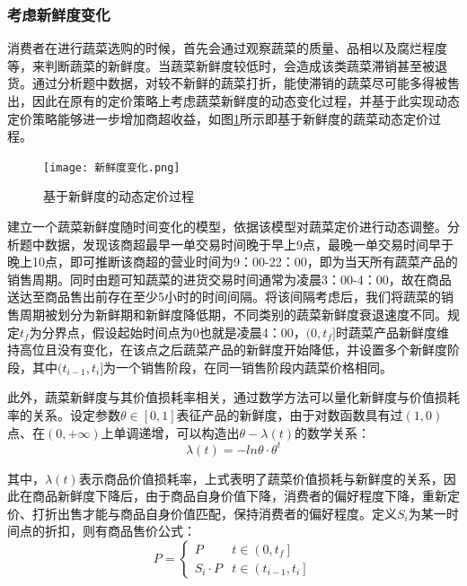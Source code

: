 \documentclass{my_paper}
\begin{document}
\subsubsection{考虑新鲜度变化}
消费者在进行蔬菜选购的时候，首先会通过观察蔬菜的质量、品相以及腐烂程度等，来判断蔬菜的新鲜度。当蔬菜新鲜度较低时，会造成该类蔬菜滞销甚至被退货。通过分析题中数据，对较不新鲜的蔬菜打折，能使滞销的蔬菜尽可能多得被售出，因此在原有的定价策略上考虑蔬菜新鲜度的动态变化过程，并基于此实现动态定价策略能够进一步增加商超收益，如图\ref{基于新鲜度的动态定价过程}所示即基于新鲜度的蔬菜动态定价过程。

\begin{figure}[H]
 \centering
 \texttt{[image: 新鲜度变化.png]} 
 \caption{基于新鲜度的动态定价过程} %
 \label{基于新鲜度的动态定价过程} %
\end{figure}\par

建立一个蔬菜新鲜度随时间变化的模型，依据该模型对蔬菜定价进行动态调整。分析题中数据，发现该商超最早一单交易时间晚于早上9点，最晚一单交易时间早于晚上10点，即可推断该商超的营业时间为9：00-22：00，即为当天所有蔬菜产品的销售周期。同时由题可知蔬菜的进货交易时间通常为凌晨3：00-4：00，故在商品送达至商品售出前存在至少5小时的时间间隔。将该间隔考虑后，我们将蔬菜的销售周期被划分为新鲜期和新鲜度降低期，不同类别的蔬菜新鲜度衰退速度不同。规定$t_f$为分界点，假设起始时间点为0也就是凌晨4：00，$(0,t_f]$时蔬菜产品新鲜度维持高位且没有变化，在该点之后蔬菜产品的新鲜度开始降低，并设置多个新鲜度阶段，其中$(t_{i-1},t_i]$为一个销售阶段，在同一销售阶段内蔬菜价格相同。

此外，蔬菜新鲜度与其价值损耗率相关，通过数学方法可以量化新鲜度与价值损耗率的关系。设定参数$\theta \in [0,1]$表征产品的新鲜度，由于对数函数具有过$(1,0)$点、在$(0,+\infty)$上单调递增，可以构造出$\theta-\lambda(t)$的数学关系：
\begin{equation}
\lambda(t)=-ln \theta \cdot \theta^t
\end{equation}\par
其中，$\lambda(t)$表示商品价值损耗率，上式表明了蔬菜价值损耗与新鲜度的关系，因此在商品新鲜度下降后，由于商品自身价值下降，消费者的偏好程度下降，重新定价、打折出售才能与商品自身价值匹配，保持消费者的偏好程度。定义$S_i$为某一时间点的折扣，则有商品售价公式：
\begin{equation}
    P=\left\{\begin{array}{cl}
P & t \in\left(0, t_f\right] \\
S_i \cdot P & t \in\left(t_{i-1}, t_i\right]
\end{array}\right.
\end{equation}
\end{document}
